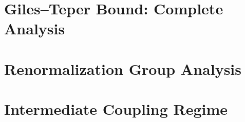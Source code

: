 \documentclass[11pt,a4paper]{report}
\begin{document}
\chapter{Giles--Teper Bound: Complete Analysis}
\label{ch:giles-teper}

\chapter{Renormalization Group Analysis}
\label{ch:rg-analysis}

\chapter{Intermediate Coupling Regime}
\label{ch:intermediate}
\end{document}
